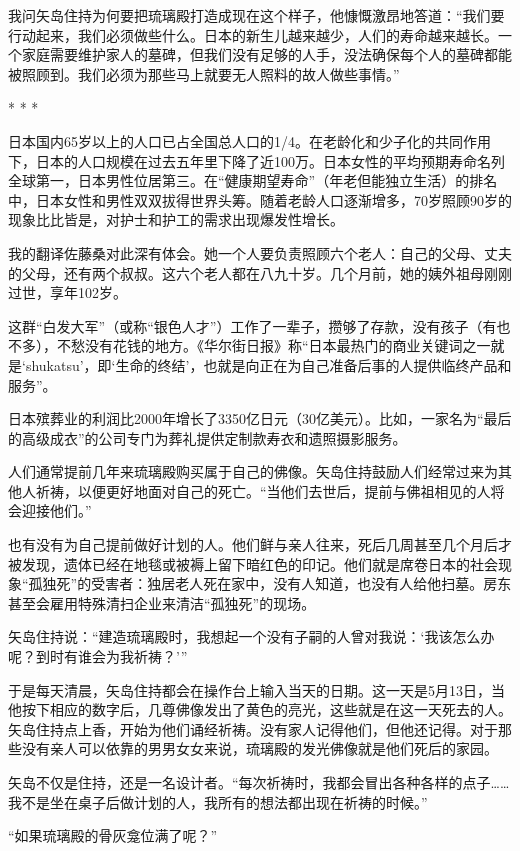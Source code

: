 \documentclass[12pt,oneside]{book}
\begin{document}
\begin{bookref}[frametitle={\cite{好好告别}}]
我问矢岛住持为何要把琉璃殿打造成现在这个样子，他慷慨激昂地答道：“我们要行动起来，我们必须做些什么。日本的新生儿越来越少，人们的寿命越来越长。一个家庭需要维护家人的墓碑，但我们没有足够的人手，没法确保每个人的墓碑都能被照顾到。我们必须为那些马上就要无人照料的故人做些事情。”

\begin{center}
* * *
\end{center}
日本国内65岁以上的人口已占全国总人口的1/4。在老龄化和少子化的共同作用下，日本的人口规模在过去五年里下降了近100万。日本女性的平均预期寿命名列全球第一，日本男性位居第三。在“健康期望寿命”（年老但能独立生活）的排名中，日本女性和男性双双拔得世界头筹。随着老龄人口逐渐增多，70岁照顾90岁的现象比比皆是，对护士和护工的需求出现爆发性增长。

我的翻译佐藤桑对此深有体会。她一个人要负责照顾六个老人：自己的父母、丈夫的父母，还有两个叔叔。这六个老人都在八九十岁。几个月前，她的姨外祖母刚刚过世，享年102岁。

这群“白发大军”（或称“银色人才”）工作了一辈子，攒够了存款，没有孩子（有也不多），不愁没有花钱的地方。《华尔街日报》称“日本最热门的商业关键词之一就是‘shukatsu’，即‘生命的终结’，也就是向正在为自己准备后事的人提供临终产品和服务”。

日本殡葬业的利润比2000年增长了3350亿日元（30亿美元）。比如，一家名为“最后的高级成衣”的公司专门为葬礼提供定制款寿衣和遗照摄影服务。

人们通常提前几年来琉璃殿购买属于自己的佛像。矢岛住持鼓励人们经常过来为其他人祈祷，以便更好地面对自己的死亡。“当他们去世后，提前与佛祖相见的人将会迎接他们。”

也有没有为自己提前做好计划的人。他们鲜与亲人往来，死后几周甚至几个月后才被发现，遗体已经在地毯或被褥上留下暗红色的印记。他们就是席卷日本的社会现象“孤独死”的受害者：独居老人死在家中，没有人知道，也没有人给他扫墓。房东甚至会雇用特殊清扫企业来清洁“孤独死”的现场。

矢岛住持说：“建造琉璃殿时，我想起一个没有子嗣的人曾对我说：‘我该怎么办呢？到时有谁会为我祈祷？’”

于是每天清晨，矢岛住持都会在操作台上输入当天的日期。这一天是5月13日，当他按下相应的数字后，几尊佛像发出了黄色的亮光，这些就是在这一天死去的人。矢岛住持点上香，开始为他们诵经祈祷。没有家人记得他们，但他还记得。对于那些没有亲人可以依靠的男男女女来说，琉璃殿的发光佛像就是他们死后的家园。

矢岛不仅是住持，还是一名设计者。“每次祈祷时，我都会冒出各种各样的点子……我不是坐在桌子后做计划的人，我所有的想法都出现在祈祷的时候。”

“如果琉璃殿的骨灰龛位满了呢？”


\end{bookref}
\end{document}

